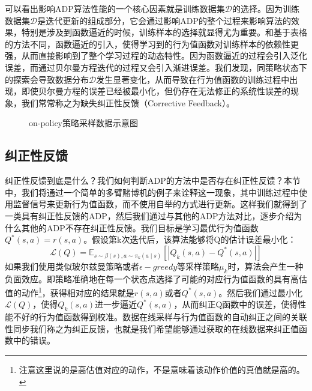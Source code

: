 可以看出影响ADP算法性能的一个核心因素就是训练数据集$\mathcal{D}$的选择。因为训练数据集$\mathcal{D}$是迭代更新的组成部分，它会通过影响ADP的整个过程来影响算法的效果，特别是涉及到函数逼近的时候，训练样本的选择就显得尤为重要。和基于表格的方法不同，函数逼近的引入，使得学习到的行为值函数对训练样本的依赖性更强，从而直接影响到了整个学习过程的动态特性。因为函数逼近的过程会引入泛化误差，而通过贝尔曼方程迭代的过程又会引入渐进误差。我们发现，同策略状态下的探索会导致数据分布$\mathcal{D}$发生显著变化，从而导致在行为值函数的训练过程中出现，即使贝尔曼方程的误差已经被最小化，但仍存在无法修正的系统性误差的现象，我们常常称之为缺失纠正性反馈（Corrective Feedback）。
\begin{figure}[!t]
	\centering
	\caption{on-policy策略采样数据示意图}
	\label{Fig: Run of an ADP algorithm with on-policy data collection.}
\end{figure}

\subsection{纠正性反馈}
纠正性反馈到底是什么？我们如何判断ADP的方法中是否存在纠正性反馈？本节中，我们将通过一个简单的多臂赌博机的例子来诠释这一现象，其中训练过程中使用监督信号来更新行为值函数，而不使用自举的方式进行更新。这样我们就得到了一类具有纠正性反馈的ADP，然后我们通过与其他的ADP方法对比，逐步介绍为什么其他的ADP不存在纠正性反馈。我们目标是学习最优行为值函数$Q^{*}(s,a)=r(s,a)$。假设第k次迭代后，该算法能够将Q的估计误差最小化：
\begin{equation}
    \mathcal{L}(Q)=\mathbb{E}_{s \sim \beta(s), a \sim \pi_{k}(a \mid s)}\left[\left|Q_{k}(s, a)-Q^{*}(s, a)\right|\right]
\end{equation}
如果我们使用类似玻尔兹曼策略或者$\epsilon-greedy$等采样策略$\mu_k$时，算法会产生一种负面效应。即策略准确地在每一个状态点选择了可能的对应行为值函数的具有高估值的动作\footnote{注意这里说的是高估值对应的动作，不是意味着该动作价值的真值就是高的。}，获得相对应的结果就是$r(s,a)$或者$Q^*(s,a)$。然后我们通过最小化$\mathcal{L}(Q)$，使得$Q_k(s,a)$进一步逼近$Q^*(s,a)$，从而纠正Q函数中的误差，使得性能不好的行为值函数得到校准。数据在线采样与行为值函数的自动纠正之间的关联性同步我们称之为纠正反馈，也就是我们希望能够通过获取的在线数据来纠正值函数中的错误。

